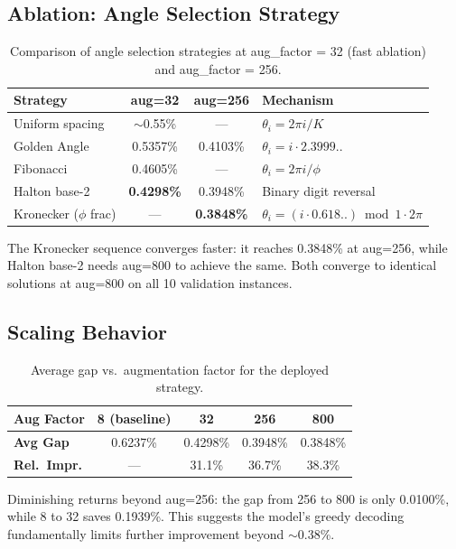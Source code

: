 \documentclass[11pt,a4paper]{article}
\begin{document}
\subsection{Ablation: Angle Selection Strategy}

\begin{table}[h]
\centering
\caption{Comparison of angle selection strategies at aug\_factor = 32
(fast ablation) and aug\_factor = 256.}
\label{tab:ablation}
\small
\begin{tabular}{@{}lccl@{}}
\toprule
\textbf{Strategy} & \textbf{aug=32} & \textbf{aug=256} & \textbf{Mechanism} \\
\midrule
Uniform spacing & $\sim$0.55\% & --- & $\theta_i = 2\pi i / K$ \\
Golden Angle & 0.5357\% & 0.4103\% & $\theta_i = i \cdot 2.3999..$ \\
Fibonacci & 0.4605\% & --- & $\theta_i = 2\pi i / \phi$ \\
Halton base-2 & \textbf{0.4298\%} & 0.3948\% & Binary digit reversal \\
Kronecker ($\phi$ frac) & --- & \textbf{0.3848\%} & $\theta_i = (i \cdot 0.618..) \bmod 1 \cdot 2\pi$ \\
\bottomrule
\end{tabular}
\end{table}

The Kronecker sequence converges faster: it reaches 0.3848\% at aug=256,
while Halton base-2 needs aug=800 to achieve the same. Both converge to
identical solutions at aug=800 on all 10 validation instances.

\subsection{Scaling Behavior}

\begin{table}[h]
\centering
\caption{Average gap vs.\ augmentation factor for the deployed strategy.}
\label{tab:scaling}
\small
\begin{tabular}{@{}lcccc@{}}
\toprule
\textbf{Aug Factor} & 8 (baseline) & 32 & 256 & 800 \\
\midrule
\textbf{Avg Gap} & 0.6237\% & 0.4298\% & 0.3948\% & 0.3848\% \\
\textbf{Rel.\ Impr.} & --- & 31.1\% & 36.7\% & 38.3\% \\
\bottomrule
\end{tabular}
\end{table}

Diminishing returns beyond aug=256: the gap from 256 to 800 is only
0.0100\%, while 8 to 32 saves 0.1939\%. This suggests the model's greedy
decoding fundamentally limits further improvement beyond $\sim$0.38\%.
\end{document}
